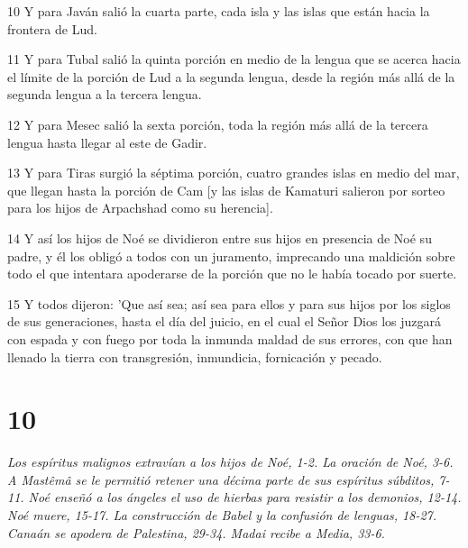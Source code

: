 \par 10 Y para Javán salió la cuarta parte, cada isla y las islas que están hacia la frontera de Lud.
\par 11 Y para Tubal salió la quinta porción en medio de la lengua que se acerca hacia el límite de la porción de Lud a la segunda lengua, desde la región más allá de la segunda lengua a la tercera lengua.
\par 12 Y para Mesec salió la sexta porción, toda la región más allá de la tercera lengua hasta llegar al este de Gadir.
\par 13 Y para Tiras surgió la séptima porción, cuatro grandes islas en medio del mar, que llegan hasta la porción de Cam [y las islas de Kamaturi salieron por sorteo para los hijos de Arpachshad como su herencia].
\par 14 Y así los hijos de Noé se dividieron entre sus hijos en presencia de Noé su padre, y él los obligó a todos con un juramento, imprecando una maldición sobre todo el que intentara apoderarse de la porción que no le había tocado por suerte.
\par 15 Y todos dijeron: 'Que así sea; así sea para ellos y para sus hijos por los siglos de sus generaciones, hasta el día del juicio, en el cual el Señor Dios los juzgará con espada y con fuego por toda la inmunda maldad de sus errores, con que han llenado la tierra con transgresión, inmundicia, fornicación y pecado.

\chapter{10}

\par \textit{Los espíritus malignos extravían a los hijos de Noé, 1-2. La oración de Noé, 3-6. A Mastêmâ se le permitió retener una décima parte de sus espíritus súbditos, 7-11. Noé enseñó a los ángeles el uso de hierbas para resistir a los demonios, 12-14. Noé muere, 15-17. La construcción de Babel y la confusión de lenguas, 18-27. Canaán se apodera de Palestina, 29-34. Madai recibe a Media, 33-6.}

